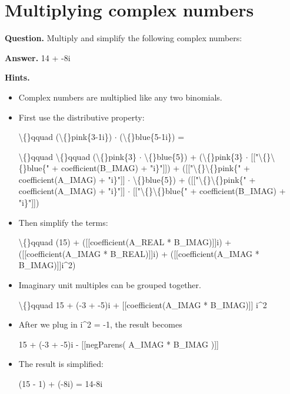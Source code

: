 \documentclass{article}
\begin{document}
\section*{Multiplying complex numbers}
\textbf{Question.} Multiply and simplify the following complex numbers:

\textbf{Answer.} 14 + -8i

\textbf{Hints.}
\begin{itemize}
  \item Complex numbers are multiplied like any two binomials.
  \item First use the distributive property:
                    
                        \textbackslash\{\}qquad (\textbackslash\{\}pink\{3-1i\}) $\cdot$ (\textbackslash\{\}blue\{5-1i\}) = 
                        
                            \textbackslash\{\}qquad \textbackslash\{\}qquad
                            (\textbackslash\{\}pink\{3\} $\cdot$ \textbackslash\{\}blue\{5\}) + (\textbackslash\{\}pink\{3\} $\cdot$ [["\textbackslash\{\}\textbackslash\{\}blue\{" + coefficient(B\_IMAG) + "i\}"]]) +
                            ([["\textbackslash\{\}\textbackslash\{\}pink\{" + coefficient(A\_IMAG) + "i\}"]] $\cdot$ \textbackslash\{\}blue\{5\}) + ([["\textbackslash\{\}\textbackslash\{\}pink\{" + coefficient(A\_IMAG) + "i\}"]] $\cdot$ [["\textbackslash\{\}\textbackslash\{\}blue\{" + coefficient(B\_IMAG) + "i\}"]])
  \item Then simplify the terms:
                    
                        \textbackslash\{\}qquad (15) + ([[coefficient(A\_REAL * B\_IMAG)]]i) +
                        ([[coefficient(A\_IMAG * B\_REAL)]]i) + ([[coefficient(A\_IMAG * B\_IMAG)]]i\textasciicircum{}2)
  \item Imaginary unit multiples can be grouped together.
                    
                        \textbackslash\{\}qquad
                        15 + (-3 + -5)i + [[coefficient(A\_IMAG * B\_IMAG)]] i\textasciicircum{}2
  \item After we plug in i\textasciicircum{}2 = -1, the result becomes
                    
                        15 + (-3 + -5)i - [[negParens( A\_IMAG * B\_IMAG )]]
  \item The result is simplified:
                    
                        (15 - 1) + (-8i) = 14-8i
\end{itemize}
\end{document}
